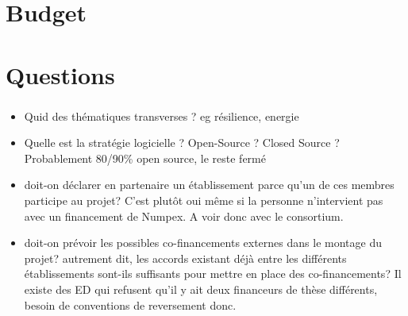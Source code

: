 \section{Budget}

\begin{frame}
  \frametitle{\insertsectionhead}

  
  

\end{frame}
\section{Questions}

\begin{frame}
  \frametitle{\insertsectionhead}  

  \begin{itemize}
    \item Quid des thématiques transverses ? eg résilience, energie 
    \item Quelle est la stratégie logicielle ? Open-Source ? Closed Source ? Probablement 80/90\% open source, le reste fermé
    \item doit-on déclarer en partenaire un établissement parce qu'un de ces membres participe au projet? C'est plutôt oui même si la personne n'intervient pas avec un financement de Numpex. A voir donc avec le consortium.
    \item doit-on prévoir les possibles co-financements externes dans le montage du projet? autrement dit, les accords existant déjà entre les différents établissements sont-ils suffisants pour mettre en place des co-financements? Il existe des ED qui refusent qu'il y ait deux financeurs de thèse différents, besoin de conventions de reversement donc.
  \end{itemize}

  

\end{frame}
